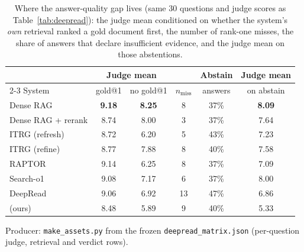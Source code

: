\begin{table}[t]
\centering\footnotesize
\setlength{\tabcolsep}{3.0pt}
\caption{Where the answer-quality gap lives (same 30 questions and judge
scores as Table~\ref{tab:deepread}): the judge mean conditioned on whether
the system's \emph{own} retrieval ranked a gold document first, the number
of rank-one misses, the share of answers that declare insufficient
evidence, and the judge mean on those abstentions.}
\label{tab:ansqual}
\begin{tabular}{@{}lccccc@{}}
\toprule
 & \multicolumn{2}{c}{Judge mean} & & Abstain & Judge mean \\
\cmidrule(lr){2-3}
System & gold@1 & no gold@1 & $n_{\text{miss}}$ & answers & on abstain \\
\midrule
Dense RAG & \textbf{9.18} & \textbf{8.25} & 8 & 37\% & \textbf{8.09} \\
Dense RAG + rerank & 8.74 & 8.00 & 3 & 37\% & 7.64 \\
ITRG (refresh) & 8.72 & 6.20 & 5 & 43\% & 7.23 \\
ITRG (refine) & 8.77 & 7.88 & 8 & 40\% & 7.58 \\
RAPTOR & 9.14 & 6.25 & 8 & 37\% & 7.09 \\
Search-o1 & 9.08 & 7.17 & 6 & 37\% & 8.00 \\
DeepRead & 9.06 & 6.92 & 13 & 47\% & 6.86 \\
\sys{} (ours) & 8.48 & 5.89 & 9 & 40\% & 5.33 \\
\bottomrule
\end{tabular}

\vspace{2pt}
\parbox{\columnwidth}{\scriptsize Producer: \texttt{make\_assets.py} from the
frozen \texttt{deepread\_matrix.json} (per-question judge, retrieval and
verdict rows).}
\end{table}
